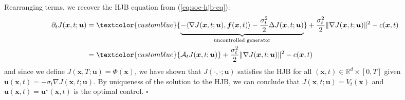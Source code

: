 \documentclass{article}
\newcommand{\bluetext}[1]{\textcolor{customblue}{#1}}
\begin{document}
Rearranging terms, we recover the HJB equation from (\ref{eq:soc-hjb-eq}):
\begin{align}
    \partial_tJ(\boldsymbol{x},t;\boldsymbol{u})&=\bluetext{\underbrace{-\langle \nabla J(\boldsymbol{x},t;\boldsymbol{u}), \boldsymbol{f}(\boldsymbol{x},t)\rangle-\frac{\sigma_t^2}{2}\Delta J(\boldsymbol{x},t;\boldsymbol{u})}_{\text{uncontrolled generator}}}+\frac{\sigma^2_t}{2}\|\nabla J(\boldsymbol{x},t;\boldsymbol{u})\|^2-c(\boldsymbol{x},t)\nonumber\\
    &=\bluetext{\mathcal{A}_tJ(\boldsymbol{x},t;\boldsymbol{u})}+\frac{\sigma^2_t}{2}\|\nabla J(\boldsymbol{x},t;\boldsymbol{u})\|^2-c(\boldsymbol{x},t)
\end{align}
and since we define $J(\boldsymbol{x},T;\boldsymbol{u})=\Phi(\boldsymbol{x})$, we have shown that $J(\cdot, \cdot; \boldsymbol{u})$ satisfies the HJB for all $(\boldsymbol{x},t)\in \mathbb{R}^d\times [0,T]$ given $\boldsymbol{u}(\boldsymbol{x},t)=-\sigma_t\nabla J(\boldsymbol{x},t;\boldsymbol{u})$. By uniqueness of the solution to the HJB, we can conclude that $J(\boldsymbol{x},t;\boldsymbol{u})=V_t(\boldsymbol{x})$ and $\boldsymbol{u}(\boldsymbol{x},t)=\boldsymbol{u}^\star(\boldsymbol{x},t)$ is the optimal control.
\hfill $\square$
\end{document}
